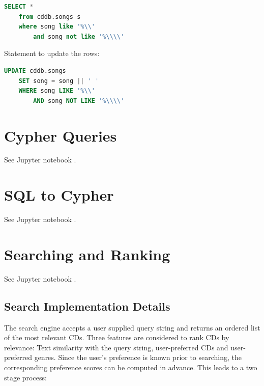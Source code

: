 \documentclass{article}
\begin{document}
\begin{lstlisting}[language=sql]
    SELECT * 
    from cddb.songs s 
    where song like '%\\' 
        and song not like '%\\\\'
\end{lstlisting}

Statement to update the rows:

\begin{lstlisting}[language=sql]
    UPDATE cddb.songs 
    SET song = song || ' ' 
    WHERE song LIKE '%\\' 
        AND song NOT LIKE '%\\\\'
\end{lstlisting}



\section{Cypher Queries}

See Jupyter notebook .

\section{SQL to Cypher}

See Jupyter notebook .

\section{Searching and Ranking}

See Jupyter notebook .

\subsection{Search Implementation Details}

\vspace*{0.1cm}

\noindent
The search engine accepts a user supplied query string and returns an ordered list of the most relevant CDs. Three features are considered to rank CDs by relevance: Text similarity with the query string, user-preferred CDs and user-preferred genres. Since the user's preference is known prior to searching, the corresponding preference scores can be computed in advance. This leads to a two stage process:
\end{document}
